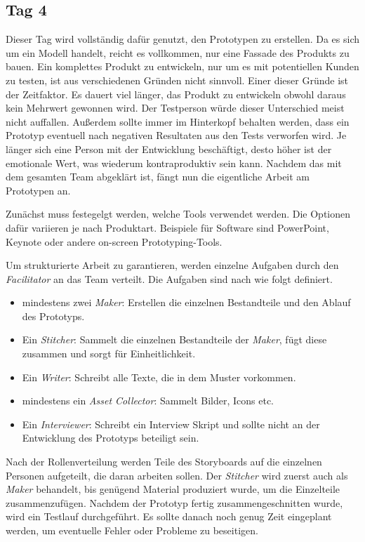 \subsection*{\label{sec:Sprint-Tag4}\thesubsection\quad Tag 4}
Dieser Tag wird vollständig dafür genutzt, den Prototypen zu erstellen. Da es sich um ein Modell handelt, reicht es vollkommen, nur eine Fassade des Produkts zu bauen. Ein komplettes Produkt zu entwickeln, nur um es mit potentiellen Kunden zu testen, ist aus verschiedenen Gründen nicht sinnvoll. Einer dieser Gründe ist der Zeitfaktor. Es dauert viel länger, das Produkt zu entwickeln obwohl daraus kein Mehrwert gewonnen wird. Der Testperson würde dieser Unterschied meist nicht auffallen. Außerdem sollte immer im Hinterkopf behalten werden, dass ein Prototyp eventuell nach negativen Resultaten aus den Tests verworfen wird. Je länger sich eine Person mit der Entwicklung beschäftigt, desto höher ist der emotionale Wert, was wiederum kontraproduktiv sein kann. Nachdem das mit dem gesamten Team abgeklärt ist, fängt nun die eigentliche Arbeit am Prototypen an.

Zunächst muss festegelgt werden, welche Tools verwendet werden. Die Optionen dafür variieren je nach Produktart. Beispiele für Software sind PowerPoint, Keynote oder andere on-screen Prototyping-Tools.

Um strukturierte Arbeit zu garantieren, werden einzelne Aufgaben durch den \textit{Facilitator} an das Team verteilt. Die Aufgaben sind nach \citeauthor{Sprint} wie folgt definiert.
\begin{itemize}
	\item mindestens zwei \textit{Maker}:
	Erstellen die einzelnen Bestandteile und den Ablauf des Prototyps.
	\item Ein \textit{Stitcher}:
	Sammelt die einzelnen Bestandteile der \textit{Maker}, fügt diese zusammen und sorgt für Einheitlichkeit.
	\item Ein \textit{Writer}:
	Schreibt alle Texte, die in dem Muster vorkommen.
	\item mindestens ein \textit{Asset Collector}:
	Sammelt Bilder, Icons etc.
	\item Ein \textit{Interviewer}:
	Schreibt ein Interview Skript und sollte nicht an der Entwicklung des Prototyps beteiligt sein.
\end{itemize}

Nach der Rollenverteilung werden Teile des Storyboards auf die einzelnen Personen aufgeteilt, die daran arbeiten sollen. Der \textit{Stitcher} wird zuerst auch als \textit{Maker} behandelt, bis genügend Material produziert wurde, um die Einzelteile zusammenzufügen. Nachdem der Prototyp fertig zusammengeschnitten wurde, wird ein Testlauf durchgeführt. Es sollte danach noch genug Zeit eingeplant werden, um eventuelle Fehler oder Probleme zu beseitigen.

